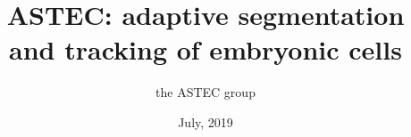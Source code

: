\documentclass{report}
\begin{document}
\title{ASTEC: adaptive segmentation and tracking of embryonic cells}
\author{the ASTEC group}
\date{July, 2019}
\maketitle

\tableofcontents



% 









\end{document}
